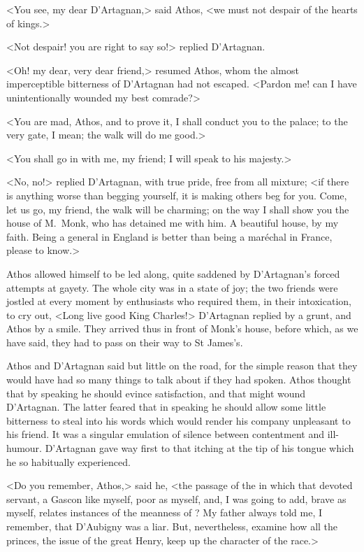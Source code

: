 <You see, my dear D'Artagnan,> said Athos, <we must not despair of the hearts of kings.>

<Not despair! you are right to say so!> replied D'Artagnan.

<Oh! my dear, very dear friend,> resumed Athos, whom the almost imperceptible bitterness of D'Artagnan had not escaped. <Pardon me! can I have unintentionally wounded my best comrade?>

<You are mad, Athos, and to prove it, I shall conduct you to the palace; to the very gate, I mean; the walk will do me good.>

<You shall go in with me, my friend; I will speak to his majesty.>

<No, no!> replied D'Artagnan, with true pride, free from all mixture; <if there is anything worse than begging yourself, it is making others beg for you. Come, let us go, my friend, the walk will be charming; on the way I shall show you the house of M.~Monk, who has detained me with him. A beautiful house, by my faith. Being a general in England is better than being a maréchal in France, please to know.>

Athos allowed himself to be led along, quite saddened by D'Artagnan's forced attempts at gayety. The whole city was in a state of joy; the two friends were jostled at every moment by enthusiasts who required them, in their intoxication, to cry out, <Long live good King Charles!> D'Artagnan replied by a grunt, and Athos by a smile. They arrived thus in front of Monk's house, before which, as we have said, they had to pass on their way to St James's.

Athos and D'Artagnan said but little on the road, for the simple reason that they would have had so many things to talk about if they had spoken. Athos thought that by speaking he should evince satisfaction, and that might wound D'Artagnan. The latter feared that in speaking he should allow some little bitterness to steal into his words which would render his company unpleasant to his friend. It was a singular emulation of silence between contentment and ill-humour. D'Artagnan gave way first to that itching at the tip of his tongue which he so habitually experienced.

<Do you remember, Athos,> said he, <the passage of the  in which that devoted servant, a Gascon like myself, poor as myself, and, I was going to add, brave as myself, relates instances of the meanness of ? My father always told me, I remember, that D'Aubigny was a liar. But, nevertheless, examine how all the princes, the issue of the great Henry, keep up the character of the race.>

